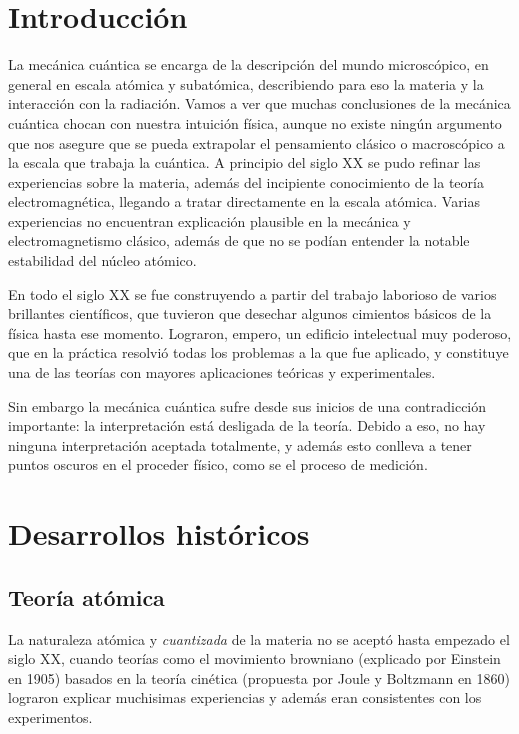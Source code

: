
\section{Introducción}
 La mecánica cuántica se encarga de la descripción del mundo microscópico, en general en escala atómica y subatómica, describiendo para eso la materia y la interacción con la radiación.
 Vamos a ver que muchas conclusiones de la mecánica cuántica chocan con nuestra intuición física, aunque no existe ningún argumento que nos asegure que se pueda extrapolar el pensamiento clásico o macroscópico a la escala que trabaja la cuántica.
 A principio del siglo XX se pudo refinar las experiencias sobre la materia, además del incipiente conocimiento de la teoría electromagnética, llegando a tratar directamente en la escala atómica.
 Varias experiencias no encuentran explicación plausible en la mecánica y electromagnetismo clásico, además de que no se podían entender la notable estabilidad del núcleo atómico.
 
 En todo el siglo XX se fue construyendo a partir del trabajo laborioso de varios brillantes científicos, que tuvieron que desechar algunos cimientos básicos de la física hasta ese momento.
 Lograron, empero, un edificio intelectual muy poderoso, que en la práctica resolvió todas los problemas a la que fue aplicado, y constituye una de las teorías con mayores aplicaciones teóricas y experimentales.
 
 Sin embargo la mecánica cuántica sufre desde sus inicios de una contradicción importante: la interpretación está desligada de la teoría. Debido a eso, no hay ninguna interpretación aceptada totalmente, y además esto conlleva a tener puntos oscuros en el proceder físico, como se el proceso de medición.
 
\section{Desarrollos históricos}

\subsection{Teoría atómica}
La naturaleza atómica y \emph{cuantizada} de la materia no se aceptó hasta empezado el siglo XX, cuando teorías como el movimiento browniano (explicado por Einstein en 1905) basados en la teoría cinética (propuesta por Joule y Boltzmann en 1860) lograron explicar muchisimas experiencias y además eran consistentes con los experimentos.

